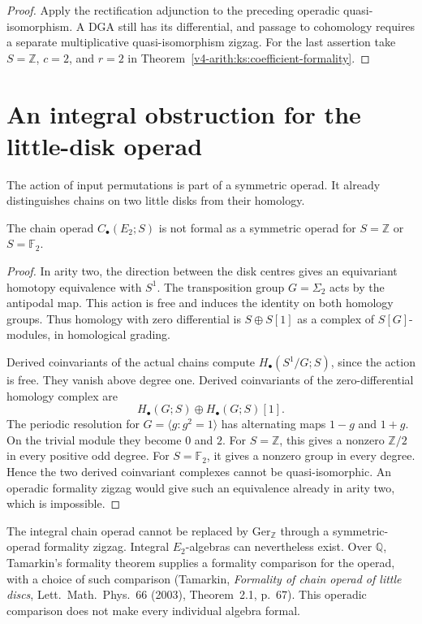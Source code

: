 \begin{proof}
Apply the rectification adjunction to the preceding operadic quasi-isomorphism.
A DGA still has its differential, and passage to cohomology requires a
separate multiplicative quasi-isomorphism zigzag.
For the last assertion take $S=\mathbb Z$, $c=2$, and $r=2$ in
Theorem~\ref{v4-arith:ks:coefficient-formality}.
\end{proof}

\section{An integral obstruction for the little-disk operad}
\label{v4-arith:ks:E2-fails}

The action of input permutations is part of a symmetric operad.
It already distinguishes chains on two little disks from their homology.

\begin{theorem}
\label{v4-arith:thm:E2-fails-integrally}
\ClaimStatusProvedHere{}
The chain operad $C_\bullet(E_2;S)$ is not formal as a symmetric
operad for $S=\mathbb Z$ or $S=\mathbb F_2$.
\end{theorem}

\begin{proof}
In arity two, the direction between the disk centres gives an
equivariant homotopy equivalence with $S^1$.
The transposition group $G=\Sigma_2$ acts by the antipodal map.
This action is free and induces the identity on both homology groups.
Thus homology with zero differential is
$S\oplus S[1]$ as a complex of $S[G]$-modules, in homological grading.

Derived coinvariants of the actual chains compute
$H_\bullet(S^1/G;S)$, since the action is free.
They vanish above degree one.
Derived coinvariants of the zero-differential homology complex are
\[
 H_\bullet(G;S)\oplus H_\bullet(G;S)[1].
\]
The periodic resolution for $G=\langle g:g^2=1\rangle$ has
alternating maps $1-g$ and $1+g$.
On the trivial module they become $0$ and $2$.
For $S=\mathbb Z$, this gives a nonzero $\mathbb Z/2$ in every positive odd degree.
For $S=\mathbb F_2$, it gives a nonzero group in every degree.
Hence the two derived coinvariant complexes cannot be quasi-isomorphic.
An operadic formality zigzag would give such an equivalence already in arity two,
which is impossible.
\end{proof}

\begin{corollary}
\label{v4-arith:cor:no-integral-E2}
\ClaimStatusProvedHere{}
The integral chain operad cannot be replaced by
$\mathrm{Ger}_{\mathbb Z}$ through a symmetric-operad formality zigzag.
Integral $E_2$-algebras can nevertheless exist.
Over $\mathbb Q$, Tamarkin's formality theorem supplies a formality
comparison for the operad, with a choice of such comparison
(Tamarkin, \emph{Formality of chain operad of little discs},
Lett.~Math.~Phys.~66 (2003), Theorem~2.1, p.~67).
This operadic comparison does not make every individual algebra formal.
\end{corollary}

